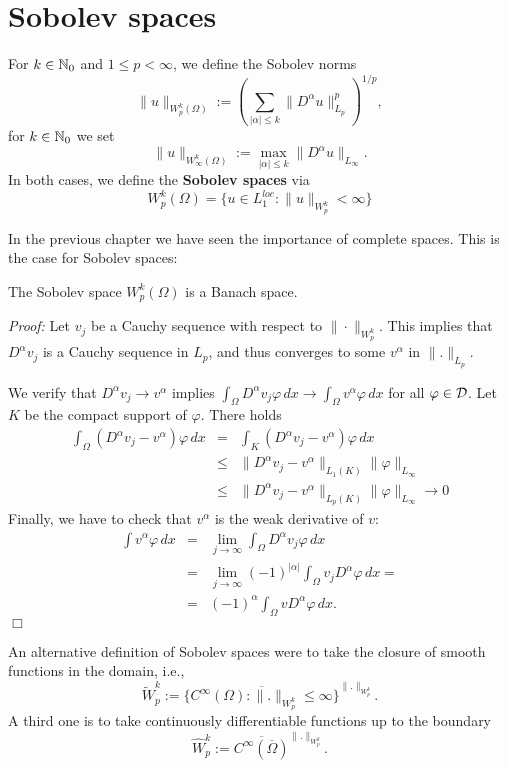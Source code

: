 \section{Sobolev spaces}

For $k \in {\mathbb N}_0$ and $1 \leq p < \infty$, we define the Sobolev norms 
$$
\| u \|_{W_p^k(\Omega)} := \left( \sum_{|\alpha| \leq k} \| D^\alpha u \|_{L_p}^p \right)^{1/p},
$$
for $k \in {\mathbb N}_0$ we set
$$
\| u \|_{W_\infty^k(\Omega)} := \max_{|\alpha| \leq k}  \| D^\alpha u \|_{L_\infty}.
$$
In both cases, we define the {\bf Sobolev spaces} via
$$
W_p^k(\Omega) = \{ u \in L_1^{loc} : \| u \|_{W_p^k} < \infty \}
$$

In the previous chapter we have seen the importance of complete spaces.
This is the case for Sobolev spaces:
\begin{theorem} The Sobolev space $W_p^k(\Omega)$ is a Banach space.
\end{theorem}
\noindent
{\em Proof:} Let $v_j$ be a Cauchy sequence with respect to $\| \cdot \|_{W_p^k}$. This implies that $D^\alpha v_j$ is a Cauchy sequence in $L_p$, and 
thus converges to some $v^\alpha$ in $\|. \|_{L_p}$. 

We verify that $D^\alpha v_j \rightarrow v^\alpha$ implies 
$\int_\Omega D^\alpha v_j \varphi \, dx \rightarrow \int_\Omega v^\alpha \varphi \, dx$ for all $\varphi \in {\cal D}$. Let $K$ be the compact support 
of $\varphi$. There holds 
\begin{eqnarray*}
\int_\Omega (D^\alpha v_j - v^\alpha) \varphi \, dx & = & 
\int_{K} (D^\alpha v_j - v^\alpha) \varphi \, dx  \\
& \leq & \| D^\alpha v_j - v^\alpha \|_{L_1(K)} \| \varphi \|_{L_\infty} \\
& \leq & \| D^\alpha v_j - v^\alpha \|_{L_p(K)} \| \varphi \|_{L_\infty}
\rightarrow 0
\end{eqnarray*}
Finally, we have to check that $v^\alpha$ is the weak derivative of $v$:
\begin{eqnarray*}
\int v^\alpha \varphi \, dx & = & 
        \lim_{j\rightarrow \infty} \int_\Omega D^\alpha v_j \varphi \, dx \\
        & = & \lim_{j\rightarrow \infty} (-1)^{|\alpha|} \int_\Omega v_j D^\alpha \varphi \, dx = \\
        & = & (-1)^\alpha \int_\Omega v  D^\alpha \varphi \, dx.
\end{eqnarray*}
\hfill $\Box$

\bigskip

An alternative definition of Sobolev spaces were to take the closure
of smooth functions in the domain, i.e.,
$$
\widetilde W_p^k := \overline{ \{ C^\infty (\Omega) : \|.\|_{W_p^k} \leq \infty \} }^{\|.\|_{W_p^k}}.
$$
A third one is to take continuously differentiable functions up to the boundary
$$
\widehat W_p^k := \overline{ C^\infty (\overline{\Omega}) }^{\|.\|_{W_p^k}}.
$$


